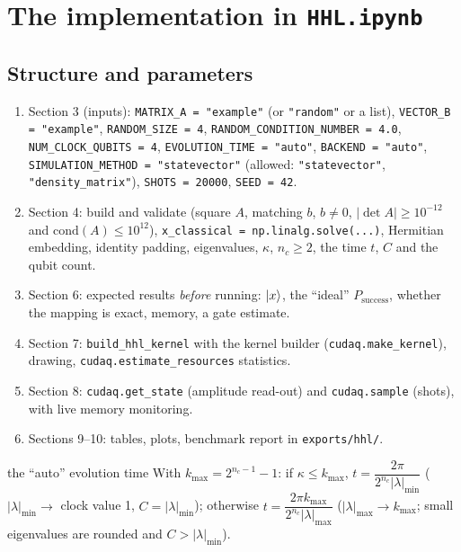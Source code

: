 \documentclass[11pt,a4paper,openany]{book}
\begin{document}
\section{The implementation in \texttt{HHL.ipynb}}
\subsection{Structure and parameters}
\begin{enumerate}[itemsep=1pt]
\item Section 3 (inputs): \texttt{MATRIX\_A = "example"} (or \texttt{"random"} or a list), \texttt{VECTOR\_B = "example"}, \texttt{RANDOM\_SIZE = 4},
\texttt{RANDOM\_CONDITION\_NUMBER = 4.0}, \texttt{NUM\_CLOCK\_QUBITS = 4}, \texttt{EVOLUTION\_TIME = "auto"}, \texttt{BACKEND = "auto"},
\texttt{SIMULATION\_METHOD = "statevector"} (allowed: \texttt{"statevector"}, \texttt{"density\_matrix"}), \texttt{SHOTS = 20000}, \texttt{SEED = 42}.
\item Section 4: build and validate (square $A$, matching $b$, $b \ne 0$, $|\det A| \ge 10^{-12}$ and $\mathrm{cond}(A) \le 10^{12}$), \texttt{x\_classical = np.linalg.solve(...)},
Hermitian embedding, identity padding, eigenvalues, $\kappa$, $n_c \ge 2$, the time $t$, $C$ and the qubit count.
\item Section 6: expected results \emph{before} running: $\ket x$, the ``ideal'' $P_{\text{success}}$, whether the mapping is exact, memory, a gate estimate.
\item Section 7: \texttt{build\_hhl\_kernel} with the kernel builder (\texttt{cudaq.make\_kernel}), drawing, \texttt{cudaq.estimate\_resources} statistics.
\item Section 8: \texttt{cudaq.get\_state} (amplitude read-out) and \texttt{cudaq.sample} (shots), with live memory monitoring.
\item Sections 9--10: tables, plots, benchmark report in \texttt{exports/hhl/}.
\end{enumerate}
\begin{keyres}{the ``auto'' evolution time}
With $k_{\max} = 2^{n_c-1} - 1$: if $\kappa \le k_{\max}$, $t = \dfrac{2\pi}{2^{n_c}|\lambda|_{\min}}$ ($|\lambda|_{\min}\to$ clock value 1, $C = |\lambda|_{\min}$);
otherwise $t = \dfrac{2\pi k_{\max}}{2^{n_c}|\lambda|_{\max}}$ ($|\lambda|_{\max}\to k_{\max}$; small eigenvalues are rounded and $C > |\lambda|_{\min}$).
\end{keyres}
\end{document}
